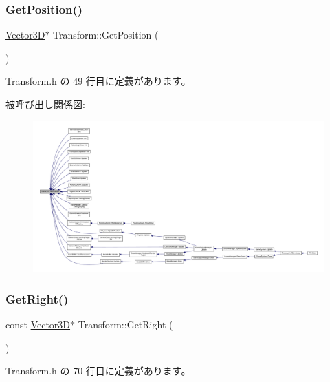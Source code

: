 \subsubsection{\texorpdfstring{Get\+Position()}{GetPosition()}}
{\footnotesize\ttfamily \mbox{\hyperlink{class_vector3_d}{Vector3D}}$\ast$ Transform\+::\+Get\+Position (\begin{DoxyParamCaption}{ }\end{DoxyParamCaption})\hspace{0.3cm}{\ttfamily [inline]}}



 Transform.\+h の 49 行目に定義があります。

被呼び出し関係図\+:
\nopagebreak
\begin{figure}[H]
\begin{center}
\leavevmode
\includegraphics[width=350pt]{class_transform_addff6461a77b9f5c5249e46deb5c2c19_icgraph}
\end{center}
\end{figure}
\mbox{\label{class_transform_a57d1da919d8df7d2452149c4bbade4d2}} 
\subsubsection{\texorpdfstring{Get\+Right()}{GetRight()}}
{\footnotesize\ttfamily const \mbox{\hyperlink{class_vector3_d}{Vector3D}}$\ast$ Transform\+::\+Get\+Right (\begin{DoxyParamCaption}{ }\end{DoxyParamCaption})\hspace{0.3cm}{\ttfamily [inline]}}



 Transform.\+h の 70 行目に定義があります。

